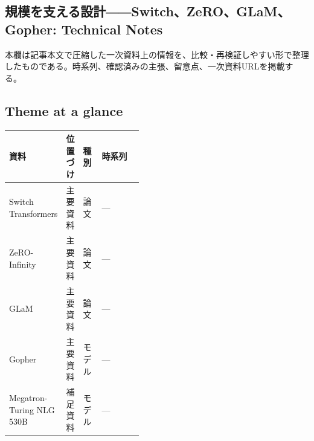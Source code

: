 \subsection*{規模を支える設計――Switch、ZeRO、GLaM、Gopher: Technical Notes}
本欄は記事本文で圧縮した一次資料上の情報を、比較・再検証しやすい形で整理したものである。時系列、確認済みの主張、留意点、一次資料URLを掲載する。
\medskip
\subsection*{Theme at a glance}
\begin{center}
\footnotesize
\begin{tabularx}{\linewidth}{@{}p{0.20\linewidth}p{0.10\linewidth}p{0.14\linewidth}X@{}}
\toprule
資料 & 位置づけ & 種別 & 時系列 \\
\midrule
Switch Transformers & 主要資料 & 論文 & — \\
ZeRO-Infinity & 主要資料 & 論文 & — \\
GLaM & 主要資料 & 論文 & — \\
Gopher & 主要資料 & モデル & — \\
Megatron-Turing NLG 530B & 補足資料 & モデル & — \\
\bottomrule
\end{tabularx}
\end{center}
\normalsize

